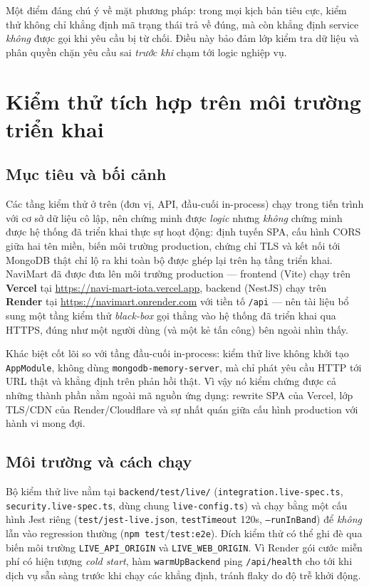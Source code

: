 \documentclass[12pt,a4paper]{article}
\newcommand{\code}[1]{\texttt{#1}}
\newcommand{\fpath}[1]{\nolinkurl{#1}}
\begin{document}
Một điểm đáng chú ý về mặt phương pháp: trong mọi kịch bản tiêu cực, kiểm thử không chỉ khẳng định mã trạng
thái trả về đúng, mà còn khẳng định service \emph{không} được gọi khi yêu cầu bị từ chối. Điều này bảo đảm
lớp kiểm tra dữ liệu và phân quyền chặn yêu cầu sai \emph{trước khi} chạm tới logic nghiệp vụ.

\section{Kiểm thử tích hợp trên môi trường triển khai}
\label{sec:int-live}

\subsection{Mục tiêu và bối cảnh}

Các tầng kiểm thử ở trên (đơn vị, API, đầu-cuối in-process) chạy trong tiến trình với cơ sở dữ liệu cô lập,
nên chứng minh được \emph{logic} nhưng \emph{không} chứng minh được hệ thống đã triển khai thực sự hoạt động:
định tuyến SPA, cấu hình CORS giữa hai tên miền, biến môi trường production, chứng chỉ TLS và kết nối tới
MongoDB thật chỉ lộ ra khi toàn bộ được ghép lại trên hạ tầng triển khai. NaviMart đã được đưa lên môi trường
production --- frontend (Vite) chạy trên \textbf{Vercel} tại \url{https://navi-mart-iota.vercel.app}, backend
(NestJS) chạy trên \textbf{Render} tại \url{https://navimart.onrender.com} với tiền tố \code{/api} --- nên
tài liệu bổ sung một tầng kiểm thử \emph{black-box} gọi thẳng vào hệ thống đã triển khai qua HTTPS, đúng như
một người dùng (và một kẻ tấn công) bên ngoài nhìn thấy.

Khác biệt cốt lõi so với tầng đầu-cuối in-process: kiểm thử live không khởi tạo \code{AppModule}, không dùng
\code{mongodb-memory-server}, mà chỉ phát yêu cầu HTTP tới URL thật và khẳng định trên phản hồi thật. Vì vậy
nó kiểm chứng được cả những thành phần nằm ngoài mã nguồn ứng dụng: rewrite SPA của Vercel, lớp TLS/CDN của
Render/Cloudflare và sự nhất quán giữa cấu hình production với hành vi mong đợi.

\subsection{Môi trường và cách chạy}

Bộ kiểm thử live nằm tại \code{backend/test/live/} (\fpath{integration.live-spec.ts},
\fpath{security.live-spec.ts}, dùng chung \fpath{live-config.ts}) và chạy bằng một cấu hình Jest riêng
(\code{test/jest-live.json}, \code{testTimeout} 120s, \code{--runInBand}) để \emph{không} lẫn vào regression
thường (\code{npm test}/\code{test:e2e}). Đích kiểm thử có thể ghi đè qua biến môi trường \code{LIVE\_API\_ORIGIN}
và \code{LIVE\_WEB\_ORIGIN}. Vì Render gói cước miễn phí có hiện tượng \emph{cold start}, hàm \code{warmUpBackend}
ping \code{/api/health} cho tới khi dịch vụ sẵn sàng trước khi chạy các khẳng định, tránh flaky do độ trễ khởi
động.
\end{document}

